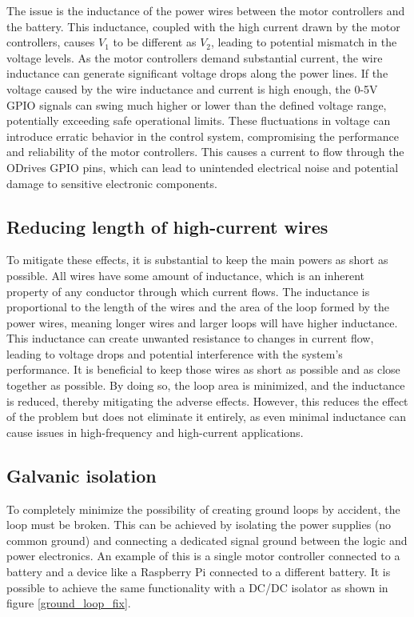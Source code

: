     The issue is the inductance of the power wires between the motor controllers and the battery. This inductance, coupled with the high current drawn by the motor controllers, causes $V_1$ to be different as $V_2$, leading to potential mismatch in the voltage levels. As the motor controllers demand substantial current, the wire inductance can generate significant voltage drops along the power lines. If the voltage caused by the wire inductance and current is high enough, the 0-5V GPIO signals can swing much higher or lower than the defined voltage range, potentially exceeding safe operational limits. These fluctuations in voltage can introduce erratic behavior in the control system, compromising the performance and reliability of the motor controllers. This causes a current to flow through the ODrives GPIO pins, which can lead to unintended electrical noise and potential damage to sensitive electronic components.

    \clearpage
    \subsection{Reducing length of high-current wires}
    
    To mitigate these effects, it is substantial to keep the main powers as short as possible. All wires have some amount of inductance, which is an inherent property of any conductor through which current flows. The inductance is proportional to the length of the wires and the area of the loop formed by the power wires, meaning longer wires and larger loops will have higher inductance. This inductance can create unwanted resistance to changes in current flow, leading to voltage drops and potential interference with the system's performance. It is beneficial to keep those wires as short as possible and as close together as possible. By doing so, the loop area is minimized, and the inductance is reduced, thereby mitigating the adverse effects. However, this reduces the effect of the problem but does not eliminate it entirely, as even minimal inductance can cause issues in high-frequency and high-current applications.
    
    \subsection{Galvanic isolation}
    
    To completely minimize the possibility of creating ground loops by accident, the loop must be broken. This can be achieved by isolating the power supplies (no common ground) and connecting a dedicated signal ground between the logic and power electronics. An example of this is a single motor controller connected to a battery and a device like a Raspberry Pi connected to a different battery. It is possible to achieve the same functionality with a DC/DC isolator as shown in figure \ref{ground_loop_fix}.
    
